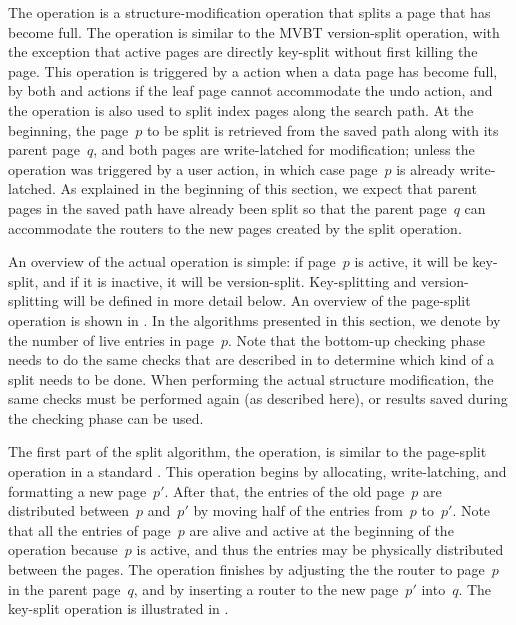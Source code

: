The  operation is a structure-modification operation
that splits a page that has become full. 
The operation is similar to the MVBT version-split operation, with the
exception that active pages are directly key-split without first killing the
page. 
This operation is triggered by a  action when a data
page has become full, by both  and 
actions if the leaf page cannot accommodate the undo action, and the
operation is also used to split index pages along the search path. 
At the beginning, the page~$p$ to be split is retrieved from the
saved path along with its parent page~$q$, and both pages are
write-latched for modification; unless the operation was triggered by a user
action, in which case page~$p$ is already write-latched.
As explained in the beginning of this section, we expect that parent
pages in the saved path have already been split so that the parent
page~$q$ can accommodate the routers to the new pages created by
the split operation. 

An overview of the actual  operation is simple: if page~$p$
is active, it will be key-split, and if it is inactive, it will be
version-split. 
Key-splitting and version-splitting will be defined in more detail below. 
An overview of the page-split operation is shown in . 
In the algorithms presented in this section, we denote by  the
number of live entries in page~$p$. 
Note that the bottom-up checking phase needs to do the same checks
that are described in  to determine which
kind of a split needs to be done. 
When performing the actual structure modification, the same checks
must be performed again (as described here), or results saved
during the checking phase can be used.

The first part of the split algorithm, the  operation, is
similar to the page-split operation in a standard \Btree. 
This operation begins by allocating, write-latching, and formatting a new
page~$p'$.
After that, the entries of the old page~$p$ are distributed between~$p$
and~$p'$ by moving half of the entries from~$p$ to~$p'$.
Note that all the entries of page~$p$ are alive and active at the
beginning of the operation because~$p$ is active, and thus the entries
may be physically distributed between the pages.
The operation finishes by adjusting the the router to page~$p$ in the parent
page~$q$, and by inserting a router to the new page~$p'$ into~$q$. 
The key-split operation is illustrated in
.


